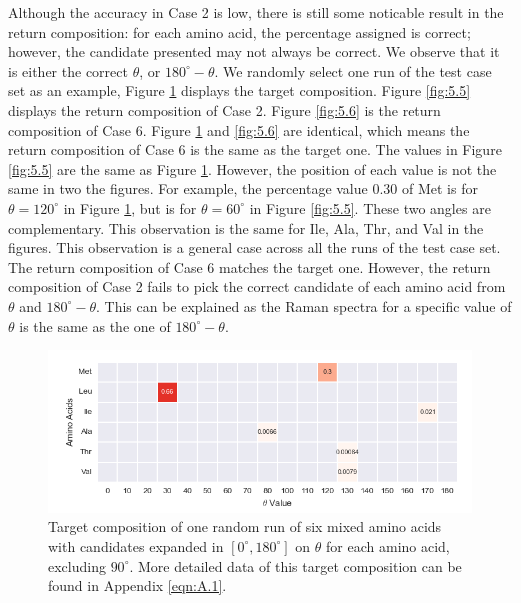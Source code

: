 Although the accuracy in Case 2 is low, there is still some noticable result in the return composition: for each amino acid, the percentage assigned is correct; however, the candidate presented may not always be correct. We observe that it is either the correct $\theta$, or $180^{\circ}-\theta$. We randomly select one run of the test case set as an example, Figure \ref{fig:5.4} displays the target composition. Figure \ref{fig:5.5} displays the return composition of Case 2. Figure \ref{fig:5.6} is the return composition of Case 6. Figure \ref{fig:5.4} and \ref{fig:5.6} are identical, which means the return composition of Case 6 is the same as the target one. The values in Figure \ref{fig:5.5} are the same as Figure \ref{fig:5.4}. However, the position of each value is not the same in two the figures. For example, the percentage value $0.30$ of Met is for $\theta = 120^{\circ}$ in Figure \ref{fig:5.4}, but is for $\theta = 60^{\circ}$ in Figure \ref{fig:5.5}. These two angles are complementary. This observation is the same for Ile, Ala, Thr, and Val in the figures. This observation is a general case across all the runs of the test case set. The return composition of Case 6 matches the target one. However, the return composition of Case 2 fails to pick the correct candidate of each amino acid from $\theta$ and $180^{\circ}-\theta$. This can be explained as the Raman spectra for a specific value of $\theta$ is the same as the one of $180^{\circ}-\theta$. \\

\begin{figure}[!ht] 
\centering
\includegraphics[scale=0.7]{Figures/mixture_target_composition_for_one_run_theta_0_180.png}
\caption{Target composition of one random run of six mixed amino acids with candidates expanded in $[0^{\circ}, 180^{\circ}]$ on $\theta$ for each amino acid, excluding $90^{\circ}$. More detailed data of this target composition can be found in Appendix \ref{eqn:A.1}. } 
\label{fig:5.4}
\end{figure}


